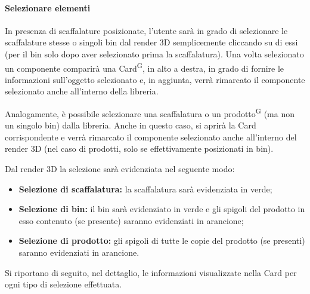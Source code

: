             \paragraph{Selezionare elementi}
               In presenza di scaffalature posizionate, l'utente sarà in grado di selezionare le scaffalature stesse o singoli bin dal render 3D semplicemente cliccando su di essi (per il bin solo dopo aver selezionato prima la scaffalatura). 
               Una volta selezionato un componente comparirà una Card\textsuperscript{G}, in alto a destra, in grado di fornire le informazioni sull'oggetto selezionato e, 
                in aggiunta, verrà rimarcato il componente selezionato anche all'interno della libreria. 

                 Analogamente, è possibile selezionare una scaffalatura o un prodotto\textsuperscript{G} (ma non un singolo bin) dalla libreria. Anche in questo caso, si aprirà la Card corrispondente e verrà rimarcato il componente selezionato anche all'interno del render 3D (nel caso di prodotti, solo se effettivamente posizionati in bin). 

                \bigskip
                \noindent Dal render 3D la selezione sarà evidenziata nel seguente modo:
                \begin{itemize}
                    \item \textbf{Selezione di scaffalatura:} la scaffalatura sarà evidenziata in verde;
                    \item \textbf{Selezione di bin:} il bin sarà evidenziato in verde e gli spigoli del prodotto in esso contenuto (se presente) saranno evidenziati in arancione; 
                    \item \textbf{Selezione di prodotto:} gli spigoli di tutte le copie del prodotto (se presenti) saranno evidenziati in arancione. 
                \end{itemize}

                \noindent Si riportano di seguito, nel dettaglio, le informazioni visualizzate nella Card per ogni tipo di selezione effettuata.

